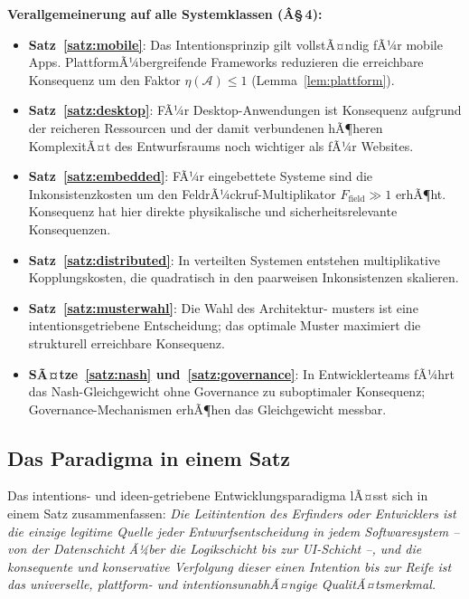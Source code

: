 ﻿\documentclass[a4paper,12pt]{article}
\theoremstyle{definition}
\begin{document}
\textbf{Verallgemeinerung auf alle Systemklassen (Â§\,4):}
\begin{itemize}
    \item \textbf{Satz~\ref{satz:mobile}}: Das Intentionsprinzip gilt
          vollstÃ¤ndig fÃ¼r mobile Apps. PlattformÃ¼bergreifende Frameworks
          reduzieren die erreichbare Konsequenz um den Faktor
          $\eta(\mathcal{A}) \leq 1$ (Lemma~\ref{lem:plattform}).
    \item \textbf{Satz~\ref{satz:desktop}}: FÃ¼r Desktop-Anwendungen
          ist Konsequenz aufgrund der reicheren Ressourcen und der damit
          verbundenen hÃ¶heren KomplexitÃ¤t des Entwurfsraums noch
          wichtiger als fÃ¼r Websites.
    \item \textbf{Satz~\ref{satz:embedded}}: FÃ¼r eingebettete Systeme
          sind die Inkonsistenzkosten um den FeldrÃ¼ckruf-Multiplikator
          $F_{\text{field}} \gg 1$ erhÃ¶ht. Konsequenz hat hier direkte
          physikalische und sicherheitsrelevante Konsequenzen.
    \item \textbf{Satz~\ref{satz:distributed}}: In verteilten Systemen
          entstehen multiplikative Kopplungskosten, die quadratisch in
          den paarweisen Inkonsistenzen skalieren.
    \item \textbf{Satz~\ref{satz:musterwahl}}: Die Wahl des Architektur-
          musters ist eine intentionsgetriebene Entscheidung; das optimale
          Muster maximiert die strukturell erreichbare Konsequenz.
    \item \textbf{SÃ¤tze~\ref{satz:nash} und~\ref{satz:governance}}:
          In Entwicklerteams fÃ¼hrt das Nash-Gleichgewicht ohne Governance
          zu suboptimaler Konsequenz; Governance-Mechanismen erhÃ¶hen das
          Gleichgewicht messbar.
\end{itemize}

\subsection{Das Paradigma in einem Satz}

Das intentions- und ideen-getriebene Entwicklungsparadigma lÃ¤sst sich
in einem Satz zusammenfassen: \emph{Die Leitintention des Erfinders oder
Entwicklers ist die einzige legitime Quelle jeder Entwurfsentscheidung
in jedem Softwaresystem -- von der Datenschicht Ã¼ber die Logikschicht
bis zur UI-Schicht --, und die konsequente und konservative Verfolgung
dieser einen Intention bis zur Reife ist das universelle, plattform-
und intentionsunabhÃ¤ngige QualitÃ¤tsmerkmal.}
\end{document}
